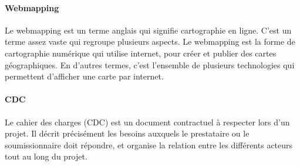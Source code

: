 \paragraph{Webmapping}
Le webmapping est un terme anglais qui signifie cartographie en ligne. 
C’est un terme assez vaste qui regroupe plusieurs aspects. Le webmapping est la 
forme de cartographie numérique qui utilise internet, pour créer et publier 
des cartes géographiques. En d’autres termes, c’est l’ensemble de plusieurs 
technologies qui permettent d’afficher une carte par internet.

\paragraph{CDC}
Le cahier des charges (CDC) est un document contractuel à respecter lors d'un 
projet. Il décrit précisément les besoins auxquels le prestataire ou le 
soumissionnaire doit répondre, et organise la relation entre les différents 
acteurs tout au long du projet.